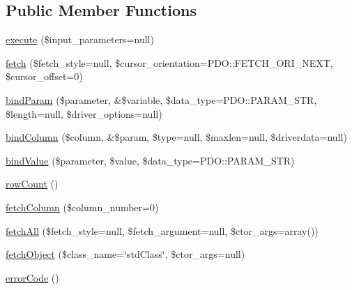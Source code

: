 \subsection*{Public Member Functions}
\begin{DoxyCompactItemize}
\item 
\mbox{\hyperlink{interface_pes_1_1_database_1_1_statement_1_1_p_d_o_statement_interface_a0e8db3191f62e77a6dac20beb5bd28e7}{execute}} (\$input\+\_\+parameters=null)
\item 
\mbox{\hyperlink{interface_pes_1_1_database_1_1_statement_1_1_p_d_o_statement_interface_a442adc7aeb1b6d8f275aa93a700d7cac}{fetch}} (\$fetch\+\_\+style=null, \$cursor\+\_\+orientation=P\+D\+O\+::\+F\+E\+T\+C\+H\+\_\+\+O\+R\+I\+\_\+\+N\+E\+XT, \$cursor\+\_\+offset=0)
\item 
\mbox{\hyperlink{interface_pes_1_1_database_1_1_statement_1_1_p_d_o_statement_interface_adc9b9b9ea817f2aa9cd9d649821f2997}{bind\+Param}} (\$parameter, \&\$variable, \$data\+\_\+type=P\+D\+O\+::\+P\+A\+R\+A\+M\+\_\+\+S\+TR, \$length=null, \$driver\+\_\+options=null)
\item 
\mbox{\hyperlink{interface_pes_1_1_database_1_1_statement_1_1_p_d_o_statement_interface_a4d6b474a6c1b9555d659597a73fb9b75}{bind\+Column}} (\$column, \&\$param, \$type=null, \$maxlen=null, \$driverdata=null)
\item 
\mbox{\hyperlink{interface_pes_1_1_database_1_1_statement_1_1_p_d_o_statement_interface_ab9f2884830bd9b2063f3422be69015dd}{bind\+Value}} (\$parameter, \$value, \$data\+\_\+type=P\+D\+O\+::\+P\+A\+R\+A\+M\+\_\+\+S\+TR)
\item 
\mbox{\hyperlink{interface_pes_1_1_database_1_1_statement_1_1_p_d_o_statement_interface_a82b073888555fc72e57142fe913db377}{row\+Count}} ()
\item 
\mbox{\hyperlink{interface_pes_1_1_database_1_1_statement_1_1_p_d_o_statement_interface_a56c542d09661688876cab075bedb619d}{fetch\+Column}} (\$column\+\_\+number=0)
\item 
\mbox{\hyperlink{interface_pes_1_1_database_1_1_statement_1_1_p_d_o_statement_interface_a5721d6df319aed83538605d4c6486947}{fetch\+All}} (\$fetch\+\_\+style=null, \$fetch\+\_\+argument=null, \$ctor\+\_\+args=array())
\item 
\mbox{\hyperlink{interface_pes_1_1_database_1_1_statement_1_1_p_d_o_statement_interface_adadbe1d7d334808106fcd3881ce45778}{fetch\+Object}} (\$class\+\_\+name=\char`\"{}std\+Class\char`\"{}, \$ctor\+\_\+args=null)
\item 
\mbox{\hyperlink{interface_pes_1_1_database_1_1_statement_1_1_p_d_o_statement_interface_a928a98b280c4dd8971ce6998eb157409}{error\+Code}} ()

\end{DoxyCompactItemize}
